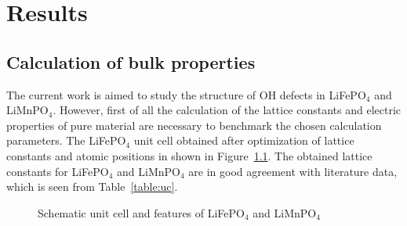 \chapter{Results}

\section{Calculation of bulk properties}

The current work is aimed to study the structure of OH defects in LiFePO$_4$ and LiMnPO$_4$.
However, first of all the calculation of the lattice constants and electric properties of pure material are necessary to benchmark the chosen calculation parameters. The  LiFePO$_4$ unit cell obtained after optimization of lattice constants and atomic positions in shown in  Figure~\ref{ris:uc}. The obtained lattice constants for LiFePO$_4$ and LiMnPO$_4$ are in good agreement with literature data, which is seen from  Table~\ref{table:uc}. 

\begin{figure}[ht]
\begin{minipage}[h]{0.9\linewidth}
\end{minipage}
\caption{Schematic unit cell and features of LiFePO$_4$ and LiMnPO$_4$}
\label{ris:uc}
\end{figure}

